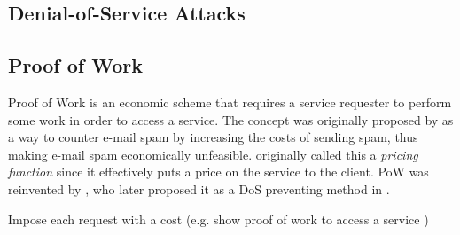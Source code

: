 \subsection{Denial-of-Service Attacks}\label{text:dos}
\begin{comment}

DoS attacks continues to plague internet services even if they are efficaciously protected against intrusive security breaches, as evidenced by the recent attack on Spamhaus \cite{BBC}. A denial of service attack is essentially a targeted effort to prevent a service from servicing legitimate requests by draining the underlying computer resources.Such an attack is executed by having each attacking machine performing only small load of the total work, relying on the cumulative work to overload the target system. 
\\
\\
A DoS attack can generally be divided into two types of strategies:

\textbf{\emph {Brute force attacks}}



The typical DoS attack exploits the server by generating excessive memory and/or CPU utilisation of the server. Popular examples include SYN spoofing attacks which triggers the server to allocate input buffers for connections that never complete initiation as well as SSL attacks in which the server CPU is overloaded with expensive public-key decryption calculations. 
\end{comment}

\subsection{Proof of Work}\label{text:pow}
Proof of Work is an economic scheme that requires a service requester to perform some work in order to access a service. The concept was originally proposed by \citeauthor{DworkN92}\cite{DworkN92} as a way to counter e-mail spam by increasing the costs of sending spam, thus making e-mail spam economically unfeasible. \citeauthor{DworkN92} originally called this a \emph{pricing function} since it effectively puts a price on the service to the client.
PoW was reinvented by \citeauthor{Back02}, who later proposed it as a DoS preventing method in . 

\begin{GrayBox}[0.75\textwidth]
Impose each request with a cost (e.g. show proof of work to access a service )
\end{GrayBox}


